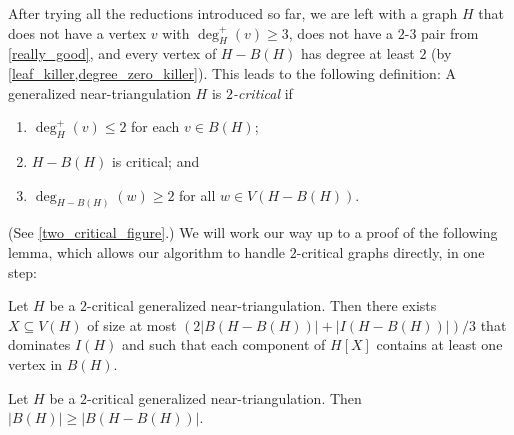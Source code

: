 \documentclass{patmorin}
\newcommand{\defin}[1]{\emph{\textcolor{brightmaroon}{#1}}}
\begin{document}
After trying all the reductions introduced so far, we are left with a graph $H$ that does not have a vertex $v$ with $\deg^+_H(v)\ge 3$, does not have a $2$-$3$ pair from \cref{really_good}, and every vertex of $H-B(H)$ has degree at least $2$ (by \cref{leaf_killer,degree_zero_killer}). This leads to the following
definition:
A generalized near-triangulation $H$ is \defin{$2$-critical} if
\begin{enumerate}[label=(2-C\arabic*),labelwidth=\widthof{(2-C2)},leftmargin=!]
  \item $\deg^+_H(v)\le 2$ for each $v\in B(H)$; \label{inner_degree_2}
  \item $H-B(H)$ is critical; \label{inner_critical} and
  \item $\deg_{H-B(H)}(w)\ge 2$ for all $w\in V(H-B(H))$. \label{inner_vertex_degree_2}
\end{enumerate}
(See \cref{two_critical_figure}.) We will work our way up to a proof of the following lemma, which allows our algorithm to handle $2$-critical graphs directly, in one step:


\begin{lem}\label{two_critical_handler}
  Let $H$ be a $2$-critical generalized near-triangulation.  Then there exists $X\subseteq V(H)$ of size at most $(2|B(H-B(H))| + |I(H-B(H))|)/3$ that dominates $I(H)$ and such that each component of $H[X]$ contains at least one vertex in $B(H)$.
\end{lem}

\begin{lem}\label{two_critical_boundary_size}
  Let $H$ be a $2$-critical generalized near-triangulation. Then $|B(H)|\ge |B(H-B(H))|$.
\end{lem}
\end{document}
